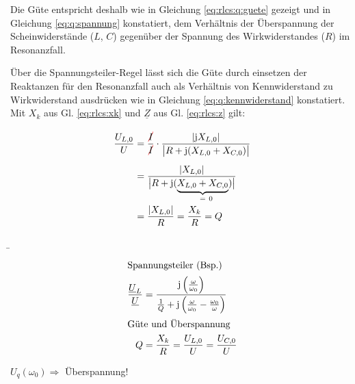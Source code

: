 \begin{frame}
{    Die Güte entspricht deshalb wie in Gleichung \ref{eq:rlcs:q:guete} gezeigt und in Gleichung \ref{eq:q:spannung} konstatiert, 
    dem Verhältnis der Überspannung der Scheinwiderstände ($L$, $C$) gegenüber der Spannung des Wirkwiderstandes ($R$) im Resonanzfall.

    Über die Spannungsteiler-Regel lässt sich die Güte durch einsetzen der Reaktanzen für den Resonanzfall auch als Verhältnis von 
    Kennwiderstand zu Wirkwiderstand ausdrücken wie in Gleichung \ref{eq:q:kennwiderstand} konstatiert. 
    Mit $X_k$ aus Gl. \ref{eq:rlcs:xk} und $\underline{Z}$ aus Gl. \ref{eq:rlcs:z} gilt:

    \begin{equation}\begin{aligned}
        \frac{U_{L,0}}{U}
        &= \frac{\redcancel{I}}{\redcancel{I}} \cdot \frac{|\mathrm{j}X_{L,0}|}{\big|R + \mathrm{j}(X_{L,0}+X_{C,0})\big|}\vphantom{\Bigg|}\\
        &= \frac{|X_{L,0}|}{ \big|R + \mathrm{j}( \underbrace{X_{L,0} + X_{C,0}}_{=\mathrlap{\ 0}})\big|}\vphantom{\Bigg|}\\
        &= \frac{|X_{L,0}|}{R} = \frac{X_k}{R} = Q
    \end{aligned}\end{equation}
}
\b{%
\begin{minipage}{0.3\textwidth}%
\begin{align*}
        \intertext{Spannungsteiler (Bsp.)}
    \frac{\underline{U}_L}{\underline{U}} &= \frac{\mathrm{j}\left(\frac{\omega}{\omega_0}\right)}{\frac{1}{Q}+\mathrm{j}\left(\frac{\omega}{\omega_0}-\frac{\omega_0}{\omega}\right)}\\
        \intertext{Güte und Überspannung}
    Q &= \frac{X_k}{R} = \frac{U_{L,0}}{U} = \frac{U_{C,0}}{U}
\end{align*}
\end{minipage}\hfill%
\begin{minipage}{0.65\textwidth}\centering
    \newline%
    $U_q(\omega_0) \Rightarrow$ Überspannung!
\end{minipage}
}
\end{frame}

